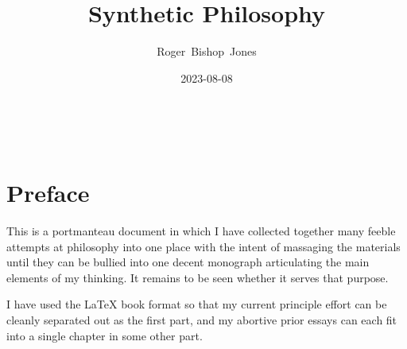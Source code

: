 \documentclass[10pt,titlepage]{book}
\title{Synthetic Philosophy}
\author{Roger~Bishop~Jones}
\date{\small 2023-08-08}
\newcommand{\ignore}[1]{}
\begin{document}

                               
\begin{titlepage}
\maketitle





\end{titlepage}

\ \

\ignore{
\begin{centering}
{}
\end{centering}
}%

\setcounter{tocdepth}{2}
{\parskip-0pt\tableofcontents}



\section{Preface}

This is a portmanteau document in which I have collected together many feeble attempts at philosophy into one place with the intent of massaging the materials until they can be bullied into one decent monograph articulating the main elements of my thinking.
It remains to be seen whether it serves that purpose.

I have used the \LaTeX{} book format so that my current principle effort can be cleanly separated out as the first part, and my abortive prior essays can each fit into a single chapter in some other part.
\end{document}
